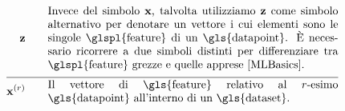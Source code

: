 \begin{align}
	\rawfeaturevec \quad\quad &\parbox{.75\textwidth}{Invece del simbolo $\featurevec$, talvolta utilizziamo $\rawfeaturevec$ come simbolo alternativo per denotare un vettore i cui elementi sono le singole \glspl{feature} di un \gls{datapoint}. È necessario ricorrere a due simboli distinti per differenziare tra \glspl{feature} grezze e quelle apprese \cite[Ch. 9]{MLBasics}.}\nonumber \\[2mm] \hline \nonumber\\[-5mm]
	\featurevec^{(\sampleidx)} \quad\quad &\parbox{.75\textwidth}{Il vettore di \gls{feature} relativo al $\sampleidx$-esimo \gls{datapoint} all'interno di un \gls{dataset}. } \nonumber %
\end{align}        


